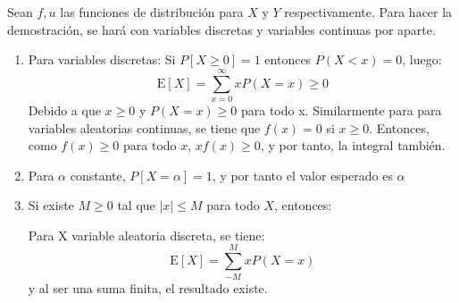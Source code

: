 \begin{Demo} Sean $f,u$ las funciones de distribución para $X$ y $Y$
    respectivamente. Para hacer la demostración, se hará con variables discretas 
    y variables continuas por aparte.

\begin{enumerate}
    \item Para variables discretas:
    Si $P[X \geq 0]=1$ entonces $P(X < x)=0$, luego:
    \[
        \text{E}[X]=\sum_{x=0}^{\infty}xP(X=x) \geq  0
    \]
    Debido a que $x\geq0$ y $P(X=x)\geq 0$ para todo x.
    Similarmente para para variables aleatorias continuas, se tiene
    que $f(x)=0$ si $x\geq0$. Entonces, como $f(x)\geq0$ para todo $x$,
    $xf(x)\geq0$, y por tanto, la integral también.
    \item Para $\alpha$ constante, $P[X=\alpha]=1$, y por tanto el valor
    esperado es $\alpha$
    \item Si existe $M\geq0$ tal que $|x|\leq M$ para todo $X$, entonces:
    
    Para X variable aleatoria discreta, se tiene:
    \[
        \text{E}[X]=\sum_{-M}^{M}xP(X=x)
    \]
    y al ser una suma finita, el resultado existe. 
    

\end{enumerate}
\end{Demo}

